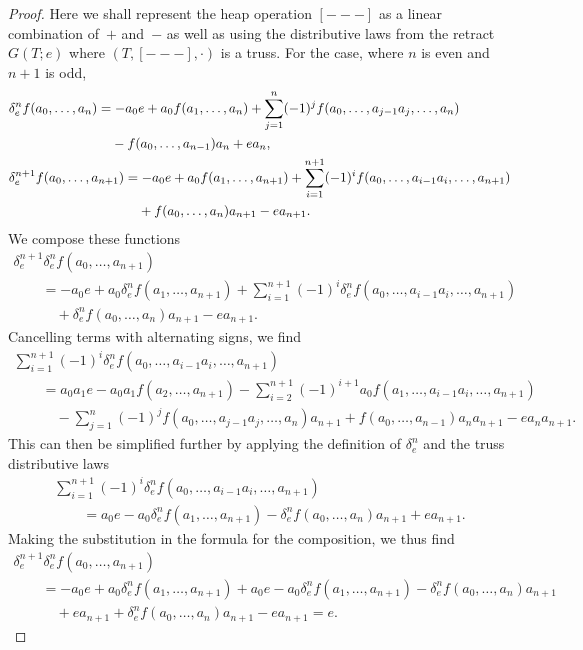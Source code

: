 \documentclass[pdftex]{sigma}
\numberwithin{equation}{section}
\begin{document}
\begin{proof}
Here we shall represent the heap operation $[---]$ as a linear combination of~$+$ and~$-$ as well as using the distributive laws from the retract $G(T;e)$ where $(T,[---],\cdot)$ is a truss.
For the case, where $n$ is even and $n+1$ is odd,
\begin{align*}
 &\delta^n_e f(a_0,\dots,a_n)= - a_0 e + a_0 f(a_1,\dots,a_n) + \sum^{n}_{j=1}(-1)^j f (a_0,\dots,a_{j-1}a_j,\dots,a_n) \\
 & \hphantom{\delta^n_e f(a_0,\dots,a_n)=}{} -f(a_0,\dots,a_{n-1})a_n+ea_n,\\
 &\delta^{n+1}_e f(a_0,\dots,a_{n+1})= - a_0 e + a_0 f(a_1,\dots,a_{n+1}) + \sum^{n+1}_{i=1}(-1)^i f (a_0,\dots,a_{i-1}a_i,\dots,a_{n+1}) \\
 &\hphantom{\delta^{n+1}_e f(a_0,\dots,a_{n+1})=}{} +f(a_0,\dots,a_{n})a_{n+1}-ea_{n+1}.
\end{align*}
We compose these functions
\begin{gather*}
 \delta^{n+1}_e\delta^{n}_e f(a_0,\dots,a_{n+1})\\
\qquad{} =- a_0 e + a_0 \delta^n_e f (a_1,\dots,a_{n+1})+ \sum_{i=1}^{n+1} (-1)^i \delta^n_e f (a_0,\dots,a_{i-1}a_i,\dots,a_{n+1}) \\
\qquad\quad{} + \delta^n_e f(a_0,\dots,a_n)a_{n+1} - ea_{n+1}.
\end{gather*}
Cancelling terms with alternating signs, we find
\begin{gather*}
   \sum_{i=1}^{n+1} (-1)^i \delta^n_e f (a_0,\dots,a_{i-1}a_i,\dots,a_{n+1}) \\
   \qquad{} = a_0 a_1 e - a_0 a_1 f(a_2,\dots,a_{n+1})
 - \sum_{i=2}^{n+1}(-1)^{i+1}a_0 f(a_1,\dots,a_{i-1}a_i,\dots,a_{n+1}) \\
\qquad\quad{}  - \sum_{j=1}^n (-1)^j f(a_0,\dots,a_{j-1}a_j,\dots,a_n)a_{n+1}  + f (a_0,\dots,a_{n-1})a_n a_{n+1} - ea_n a_{n+1}.
\end{gather*}
This can then be simplified further by applying the definition of $\delta^n_e$ and the truss distributive laws
\begin{gather*}
 \sum_{i=1}^{n+1} (-1)^i \delta^n_e f (a_0,\dots,a_{i-1}a_i,\dots,a_{n+1})\\
 \qquad =  a_0e - a_0\delta^n_e f (a_1,\dots,a_{n+1}) - \delta^n_e f (a_0,\dots,a_{n})a_{n+1} + ea_{n+1}.
\end{gather*}
Making the substitution in the formula for the composition, we thus find
\begin{gather*}
\delta^{n+1}_e\delta^{n}_e f(a_0,\dots,a_{n+1})\\
\qquad {}= - a_0 e
 +a_0\delta^n_e f (a_1,\dots,a_{n+1}) +a_0e - a_0\delta^n_e f (a_1,\dots,a_{n+1})
  - \delta^n_e f (a_0,\dots,a_{n})a_{n+1} \\
  \qquad\quad{} + ea_{n+1} + \delta^n_e f (a_0,\dots,a_{n})a_{n+1}  -ea_{n+1}=e.
\end{gather*}


\end{proof}
\end{document}
